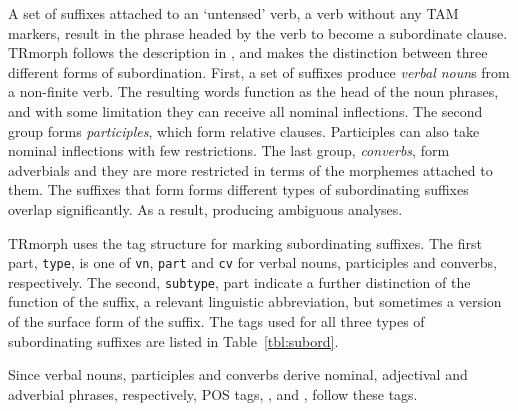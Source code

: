 \documentclass[twocolumn]{article}
\begin{document}
A set of suffixes attached to an `untensed' verb, a verb without any
TAM markers, result in the phrase headed by the verb to become a
subordinate clause. TRmorph follows the description in
\textcite{goksel2005}, and makes the distinction between three different
forms of subordination. First, a set of suffixes produce \emph{verbal
noun}s from a non-finite verb. The resulting words function as the
head of the noun phrases,
and with some limitation they can receive all nominal inflections. The
second group forms \emph{participles}, which form relative clauses.
Participles can also take nominal inflections with few
restrictions. The last group, \emph{converbs}, form adverbials and
they are more restricted in terms of the morphemes attached to
them. The suffixes that form forms different types of subordinating
suffixes overlap significantly. As a result, producing ambiguous
analyses.

TRmorph uses the tag structure  for marking
subordinating suffixes. The first part, \texttt{type}, is one of
\texttt{vn}, \texttt{part} and \texttt{cv} for verbal nouns,
participles and converbs, respectively. The second, \texttt{subtype}, 
part indicate a further distinction of the function of the suffix,
a relevant linguistic abbreviation, but sometimes a version of the
surface form of the suffix. The tags used for all three types of
subordinating suffixes are listed in Table~\ref{tbl:subord}.

Since verbal nouns, participles and converbs derive nominal, adjectival
and adverbial phrases, respectively, POS tags, , 
and , follow these tags.
\end{document}
